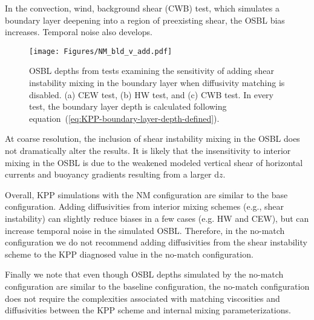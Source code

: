 \documentclass[preprint,12pt,authoryear]{agujournal}
\begin{document}
In the convection, wind, background shear (CWB) test, which simulates a boundary layer deepening into a region of preexisting shear, the OSBL bias increases.  Temporal noise also develops.  

\begin{figure}[thbp]
\centering\texttt{[image: Figures/NM\_bld\_v\_add.pdf]}
\caption{OSBL depths from tests examining the sensitivity of adding shear instability mixing in the boundary layer when diffusivity matching is disabled. (a) CEW test, (b) HW test, and (c) CWB test.  In every test, the boundary layer depth is calculated following equation~(\ref{eq:KPP-boundary-layer-depth-defined}).
}
\label{fig:NM_v_add}
\end{figure} 

At coarse resolution, the inclusion of shear instability mixing in the OSBL does not dramatically alter the results.  It is likely that the insensitivity to interior mixing in the OSBL is due to the weakened modeled vertical shear of horizontal currents and buoyancy gradients resulting from a larger d$z$. 

Overall, KPP simulations with the NM configuration are similar to the base configuration. Adding diffusivities from interior mixing schemes (e.g., shear instability) can slightly reduce biases in a few cases (e.g. HW and CEW), but can increase temporal noise in the simulated OSBL.  Therefore, in the no-match configuration we do not recommend adding diffusivities from the shear instability scheme to the KPP diagnosed value in the no-match configuration.  

Finally we note that even though OSBL depths simulated by the no-match configuration are similar to the baseline configuration, the no-match configuration does not require the complexities associated with matching viscosities and diffusivities between the KPP scheme and internal mixing parameterizations.

\end{document}
